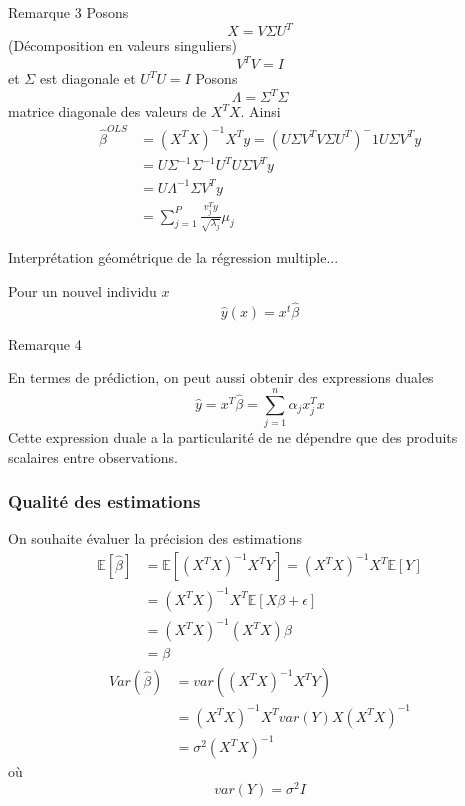 \documentclass{article}
\begin{document}
Remarque 3
Posons 
\begin{equation}
X=V\Sigma U^T
\end{equation}
(D\'ecomposition en valeurs singuliers)
\begin{equation}
V^TV=I
\end{equation}
et $\Sigma$ est diagonale et $U^TU=I$
Posons 
\begin{equation}
\Lambda=\Sigma^T\Sigma
\end{equation}
matrice diagonale des valeurs de $X^TX$. Ainsi
\begin{equation}
\begin{split}
\hat{\beta}^{OLS}&=(X^TX)^{-1}X^Ty=(U\Sigma V^TV\Sigma U^T)^-1U\Sigma V^T y\\
&=U\Sigma^{-1}\Sigma^{-1}U^TU\Sigma V^Ty\\
&=U\Lambda^{-1}\Sigma V^Ty\\
&=\sum_{j=1}^{P}\frac{v_j^Ty}{\sqrt{\lambda_j}}\mu_j
\end{split}
\end{equation}

Interpr\'etation g\'eom\'etrique de la r\'egression multiple...

Pour un nouvel individu $x$
\begin{equation}
\hat{y}(x)=x^t\hat{\beta}
\end{equation}

Remarque 4

En termes de pr\'ediction, on peut aussi obtenir des expressions duales
\begin{equation}
\hat{y}=x^T\hat{\beta}=\sum_{j=1}^n\alpha_jx^T_jx
\end{equation}
Cette expression duale a la particularit\'e de ne d\'ependre que des produits scalaires entre observations.  

\subsubsection{Qualit\'e des estimations}
On souhaite \'evaluer la pr\'ecision des estimations
\begin{equation}
\begin{split}
\mathbb{E}[\hat{\beta}]&=\mathbb{E}[(X^TX)^{-1}X^TY]=(X^TX)^{-1}X^T\mathbb{E}[Y]\\
&=(X^TX)^{-1}X^T\mathbb{E}[X\beta+\epsilon]\\
&=(X^TX)^{-1}(X^TX)\beta\\
&=\beta
\end{split}
\end{equation}
\begin{equation}
\begin{split}
Var(\hat{\beta})&=var((X^TX)^{-1}X^TY)\\
&=(X^TX)^{-1}X^{T} var(Y) X(X^TX)^{-1}\\
&=\sigma^2 (X^TX)^{-1}
\end{split}
\end{equation}
o\`u
\begin{equation}
var(Y)=\sigma^2I
\end{equation}
\end{document}
